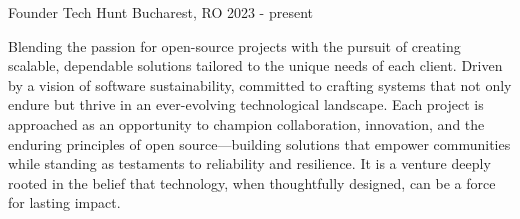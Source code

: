 \cventry
    {Founder}
    {Tech Hunt} %
    {Bucharest, RO} %
    {2023 - present} %
    {\begin{cvitems}
         \item{Blending the passion for open-source projects with the pursuit of creating scalable, dependable solutions
         tailored to the unique needs of each client. Driven by a vision of software sustainability, committed to crafting systems
         that not only endure but thrive in an ever-evolving technological landscape. Each project is approached as an opportunity
         to champion collaboration, innovation, and the enduring principles of open source—building solutions that empower communities
         while standing as testaments to reliability and resilience. It is a venture deeply rooted in the belief that technology,
         when thoughtfully designed, can be a force for lasting impact.}
    \end{cvitems}}
